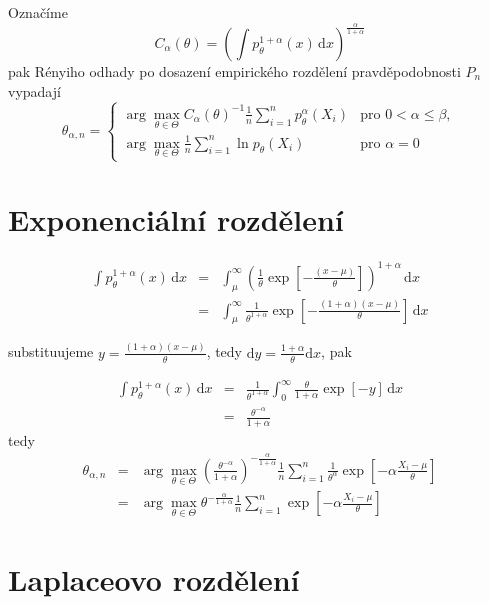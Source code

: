 \documentclass[11pt]{article}
\newcommand{\intpa}{\int p_\theta^{1+\alpha}(x) \, \mathrm{d}x }
\newcommand{\fn}{\frac{1}{n} \sum_{i=1}^n p_{\theta}^{\alpha}\left( X_i \right)}
\newcommand{\fln}{\frac{1}{n} \sum_{i=1}^n \ln p_{\theta}\left( X_i \right)}
\newcommand{\Cat}{C_\alpha\left( \theta \right)}
\newcommand{\amtiT}{\arg \max_{\theta \in \Theta}}
\begin{document}
Označíme
\begin{equation}
	\Cat = \left( \intpa \right)^{\frac{\alpha}{1+\alpha}}
\end{equation}
pak Rényiho odhady po dosazení empirického rozdělení pravděpodobnosti $ P_n $ vypadají
\begin{equation}
	\theta_{\alpha,n} = 
	\begin{cases}
		\displaystyle{ \amtiT \Cat^{-1} \fn } & \text{pro } 0 < \alpha \leq \beta, \\
		\displaystyle{ \amtiT  \fln } & \text{pro } \alpha = 0
	\end{cases}	
\end{equation}



\section{Exponenciální rozdělení}

\begin{eqnarray}
\intpa & = & \int_{\mu }^{\infty } \left( {\frac{1}{\theta} \exp{ \left[ -\frac{(x -\mu )}{\theta } \right] }} \right) ^{1 + \alpha} \, \mathrm{d}x \nonumber\\
 & = & \int_{\mu }^{\infty } {\frac{1}{\theta^{ 1 + \alpha}} \exp{ \left[ -\frac{(1 + \alpha )(x -\mu )}{\theta } \right] }} \, \mathrm{d}x \nonumber
\end{eqnarray} 

substituujeme $ y = \frac{(1+\alpha)(x-\mu)}{\theta} $, tedy $\mathrm{d}y = \frac{1+\alpha}{\theta}\mathrm{d}x $, pak

\begin{eqnarray}
\intpa & = & \frac{1}{\theta^{ 1 + \alpha}} \int_{0}^{\infty } {\frac{\theta}{1+\alpha} \exp{ \left[ -y \right] }} \, \mathrm{d}x \nonumber\\
& = & \frac{\theta ^{-\alpha }}{1+\alpha }
\end{eqnarray}
tedy 
\begin{eqnarray}
	\theta_{\alpha,n} &= &\amtiT \left( \frac{\theta ^{-\alpha }}{1+\alpha } \right)^{-\frac{\alpha}{1+\alpha}} \frac{1}{n} \sum_{i=1}^n \frac{1}{\theta^\alpha} \exp \left[-\alpha\frac{X_i-\mu}{\theta} \right] \nonumber\\
	&=&\amtiT \theta^{-\frac{\alpha}{1+\alpha}} \frac{1}{n}\sum_{i=1}^n \exp \left[-\alpha\frac{X_i-\mu}{\theta} \right]
\end{eqnarray}



\section{Laplaceovo rozdělení}
\end{document}
